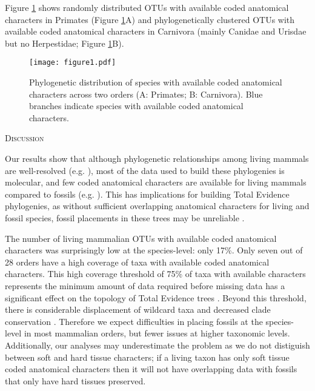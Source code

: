 \documentclass[12pt,letterpaper]{article}
\renewcommand{\section}[1]{%
\bigskip
\begin{center}
\begin{Large}
\normalfont\scshape #1
\medskip
\end{Large}
\end{center}}
\begin{document}
Figure \ref{Figure_example_coverage} shows randomly distributed OTUs with available coded anatomical characters in Primates (Figure \ref{Figure_example_coverage}A) and phylogenetically clustered OTUs with available coded anatomical characters in Carnivora (mainly Canidae and Urisdae but no Herpestidae; Figure \ref{Figure_example_coverage}B).

\begin{figure}[!htbp]
\centering
   \texttt{[image: figure1.pdf]}
\caption{Phylogenetic distribution of species with available coded anatomical characters across two orders (A: Primates; B: Carnivora).
Blue branches indicate species with available coded anatomical characters.}
\label{Figure_example_coverage}
\end{figure}

%
%

\section{Discussion}
Our results show that although phylogenetic relationships among living mammals are well-resolved (e.g. \cite{BinindaEmonds,meredithimpacts2011}), most of the data used to build these phylogenies is molecular, and few coded anatomical characters are available for living mammals compared to fossils (e.g. \cite{O'Leary08022013,ni2013oldest}).
This has implications for building Total Evidence phylogenies, as without sufficient overlapping anatomical characters for living and fossil species, fossil placements in these trees may be unreliable \cite{GuillermeCooper}. 

The number of living mammalian OTUs with available coded anatomical characters was surprisingly low at the species-level: only 17\%.
Only seven out of 28 orders have a high coverage of taxa with available coded anatomical characters.
This high coverage threshold of 75\% of taxa with available characters represents the minimum amount of data required before missing data has a significant effect on the topology of Total Evidence trees \cite{GuillermeCooper}.
Beyond this threshold, there is considerable displacement of wildcard taxa and decreased clade conservation \cite{GuillermeCooper}.
Therefore we expect difficulties in placing fossils at the species-level in most mammalian orders, but fewer issues at higher taxonomic levels.
Additionally, our analyses may underestimate the problem as we do not distiguish between soft and hard tissue characters; if a living taxon has only soft tissue coded anatomical characters then it will not have overlapping data with fossils that only have hard tissues preserved. %
\end{document}
